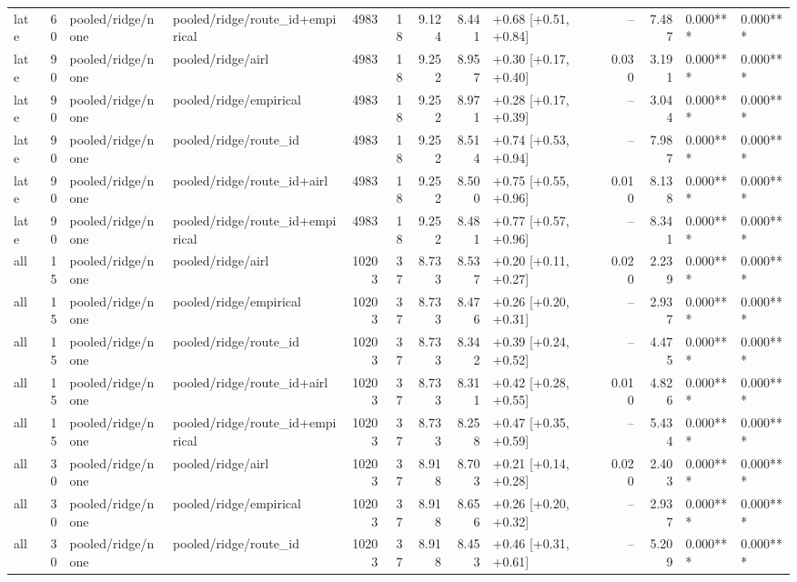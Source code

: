 \begin{tabular}{lrllrrrrlrrll}
late & 60 & pooled/ridge/none & pooled/ridge/route_id+empirical & 4983 & 18 & 9.124 & 8.441 & +0.68 [+0.51, +0.84] & -- & 7.487 & 0.000*** & 0.000*** \\
late & 90 & pooled/ridge/none & pooled/ridge/airl & 4983 & 18 & 9.252 & 8.957 & +0.30 [+0.17, +0.40] & 0.030 & 3.191 & 0.000*** & 0.000*** \\
late & 90 & pooled/ridge/none & pooled/ridge/empirical & 4983 & 18 & 9.252 & 8.971 & +0.28 [+0.17, +0.39] & -- & 3.044 & 0.000*** & 0.000*** \\
late & 90 & pooled/ridge/none & pooled/ridge/route_id & 4983 & 18 & 9.252 & 8.514 & +0.74 [+0.53, +0.94] & -- & 7.987 & 0.000*** & 0.000*** \\
late & 90 & pooled/ridge/none & pooled/ridge/route_id+airl & 4983 & 18 & 9.252 & 8.500 & +0.75 [+0.55, +0.96] & 0.010 & 8.138 & 0.000*** & 0.000*** \\
late & 90 & pooled/ridge/none & pooled/ridge/route_id+empirical & 4983 & 18 & 9.252 & 8.481 & +0.77 [+0.57, +0.96] & -- & 8.341 & 0.000*** & 0.000*** \\
all & 15 & pooled/ridge/none & pooled/ridge/airl & 10203 & 37 & 8.733 & 8.537 & +0.20 [+0.11, +0.27] & 0.020 & 2.239 & 0.000*** & 0.000*** \\
all & 15 & pooled/ridge/none & pooled/ridge/empirical & 10203 & 37 & 8.733 & 8.476 & +0.26 [+0.20, +0.31] & -- & 2.937 & 0.000*** & 0.000*** \\
all & 15 & pooled/ridge/none & pooled/ridge/route_id & 10203 & 37 & 8.733 & 8.342 & +0.39 [+0.24, +0.52] & -- & 4.475 & 0.000*** & 0.000*** \\
all & 15 & pooled/ridge/none & pooled/ridge/route_id+airl & 10203 & 37 & 8.733 & 8.311 & +0.42 [+0.28, +0.55] & 0.010 & 4.826 & 0.000*** & 0.000*** \\
all & 15 & pooled/ridge/none & pooled/ridge/route_id+empirical & 10203 & 37 & 8.733 & 8.258 & +0.47 [+0.35, +0.59] & -- & 5.434 & 0.000*** & 0.000*** \\
all & 30 & pooled/ridge/none & pooled/ridge/airl & 10203 & 37 & 8.918 & 8.703 & +0.21 [+0.14, +0.28] & 0.020 & 2.403 & 0.000*** & 0.000*** \\
all & 30 & pooled/ridge/none & pooled/ridge/empirical & 10203 & 37 & 8.918 & 8.656 & +0.26 [+0.20, +0.32] & -- & 2.937 & 0.000*** & 0.000*** \\
all & 30 & pooled/ridge/none & pooled/ridge/route_id & 10203 & 37 & 8.918 & 8.453 & +0.46 [+0.31, +0.61] & -- & 5.209 & 0.000*** & 0.000*** \\

\end{tabular}
